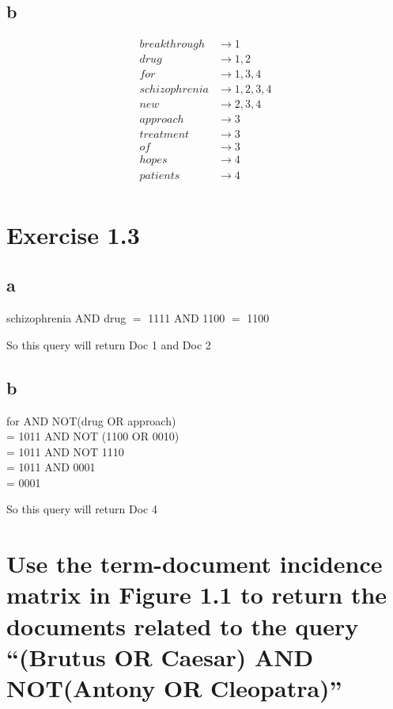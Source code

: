 \documentclass[11pt]{article} %
\begin{document}
\subsection*{b}

\begin{align*}
    breakthrough &\rightarrow 1\\
    drug &\rightarrow 1, 2\\
    for &\rightarrow 1, 3, 4\\
    schizophrenia &\rightarrow 1, 2, 3, 4\\
    new &\rightarrow 2, 3, 4\\
    approach &\rightarrow 3\\
    treatment &\rightarrow 3\\
    of &\rightarrow 3\\
    hopes &\rightarrow 4\\
    patients &\rightarrow 4\\
\end{align*}

\section*{Exercise 1.3}

\subsection*{a}

\noindent schizophrenia AND drug $=$ 1111 AND 1100 $=$ 1100

So this query will return Doc 1 and Doc 2

\subsection*{b}

\noindent for AND NOT(drug OR approach)\\
= 1011 AND NOT (1100 OR 0010)\\
= 1011 AND NOT 1110\\
= 1011 AND 0001\\
= 0001

So this query will return Doc 4

\section*{Use the term-document incidence matrix in Figure 1.1 to return the documents related to the query ``(Brutus OR Caesar) AND NOT(Antony OR Cleopatra)''}
\end{document}
